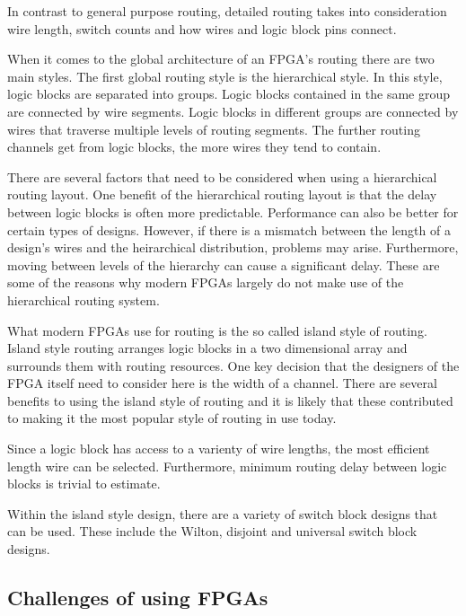 \documentclass{article}
\begin{document}
    In contrast to general purpose routing, detailed routing takes into consideration
    wire length, switch counts and how wires and logic block pins connect.

    When it comes to the global architecture of an FPGA's routing there are two main styles.
    The first global routing style is the hierarchical style. In this style,
    logic blocks are separated into groups. Logic blocks contained in the same group
    are connected by wire segments. Logic blocks in different groups are connected
    by wires that traverse multiple levels of routing segments.
    The further routing channels get from logic blocks, the more wires they tend to contain.

    There are several factors that need to be considered when using a hierarchical routing
    layout. One benefit of the hierarchical routing layout is that the delay
    between logic blocks is often more predictable. Performance can also be better for
    certain types of designs.
    However, if there is a mismatch between the length of a design's wires and the
    heirarchical distribution, problems may arise. Furthermore, moving between levels
    of the hierarchy can cause a significant delay. These are some of the reasons
    why modern FPGAs largely do not make use of the hierarchical routing system.

    What modern FPGAs use for routing is the so called island style of routing.
    Island style routing arranges logic blocks in a two dimensional array and surrounds
    them with routing resources. One key decision that the designers of the FPGA itself
    need to consider here is the width of a channel.
    There are several benefits to using the island style of routing and it is likely
    that these contributed to making it the most popular style of routing in use today.

    Since a logic block has access to a varienty of wire lengths, the most efficient length
    wire can be selected. Furthermore, minimum routing delay between logic blocks is trivial
    to estimate.

    Within the island style design, there are a variety of switch block designs that
    can be used. These include the Wilton, disjoint and universal switch block designs.
    
    \subsection{Challenges of using FPGAs}
\end{document}
